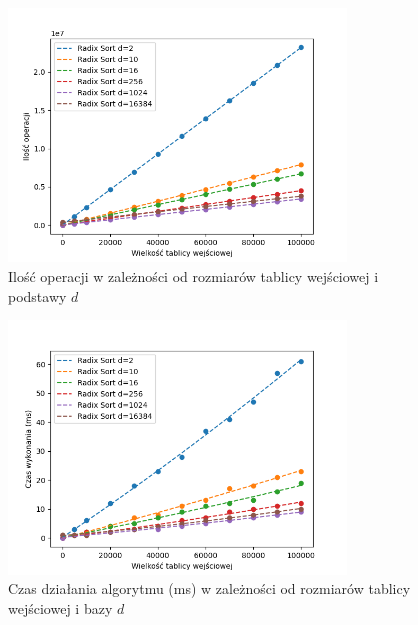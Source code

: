 \documentclass{article}
\begin{document}
\begin{figure}[H]
    \centering
    \includegraphics[width=0.8\textwidth]{Figure_3.png}
    \caption{Ilość operacji w zależności od rozmiarów tablicy wejściowej i podstawy $d$}
    \label{fig:radixsort}
\end{figure}
\begin{figure}[H]
    \centering
    \includegraphics[width=0.8\textwidth]{Figure_4.png}
    \caption{Czas działania algorytmu (ms) w zależności od rozmiarów tablicy wejściowej i bazy $d$}
    \label{fig:radixsortt}
\end{figure}
\end{document}
